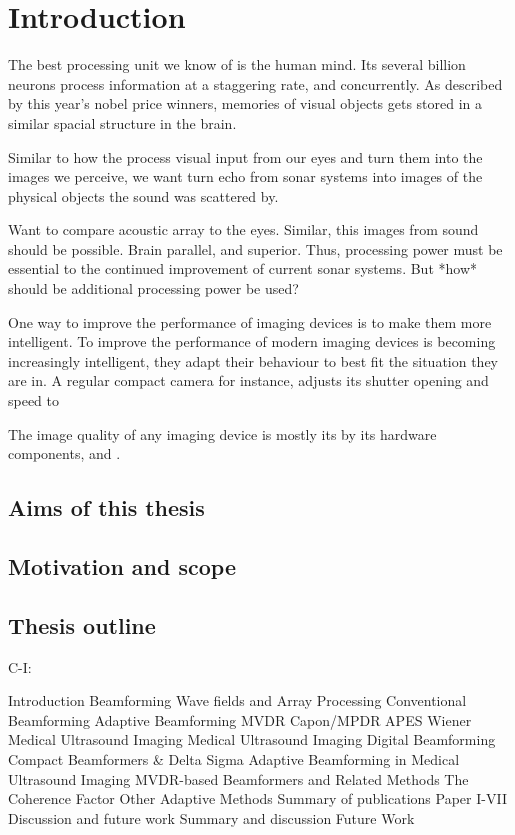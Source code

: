 
\chapter{Introduction}

The best processing unit we know of is the human mind. Its several billion neurons process information at a staggering rate, and concurrently. As described by this year's nobel price winners, memories of visual objects gets stored in a similar spacial structure in the brain.  

Similar to how the process visual input from our eyes and turn them into the images we perceive, we want turn echo from sonar systems into images of the physical objects the sound was scattered by. 

Want to compare acoustic array to the eyes. Similar, this images from sound should be possible. Brain parallel, and superior. Thus, processing power must be essential to the continued improvement of current sonar systems. But *how* should be additional processing power be used?

One way to improve the performance of imaging devices is to make them more intelligent. 
To improve the performance of modern imaging devices is becoming increasingly intelligent, they adapt their behaviour to best fit the situation they are in. A regular compact camera for instance, adjusts its shutter opening and speed to 

The image quality of any imaging device is mostly its by its hardware components, and .

\section{Aims of this thesis}

\section{Motivation and scope}

\section{Thesis outline}

C-I:

Introduction
   Beamforming
   Wave fields and Array Processing
   Conventional Beamforming
   Adaptive Beamforming
      MVDR
      Capon/MPDR
      APES
      Wiener
   Medical Ultrasound Imaging
   Medical Ultrasound Imaging
   Digital Beamforming
      Compact Beamformers \& Delta Sigma
      Adaptive Beamforming in Medical Ultrasound Imaging
         MVDR-based Beamformers and Related Methods
         The Coherence Factor
         Other Adaptive Methods
Summary of publications
   Paper I-VII
Discussion and future work
   Summary and discussion
   Future Work

